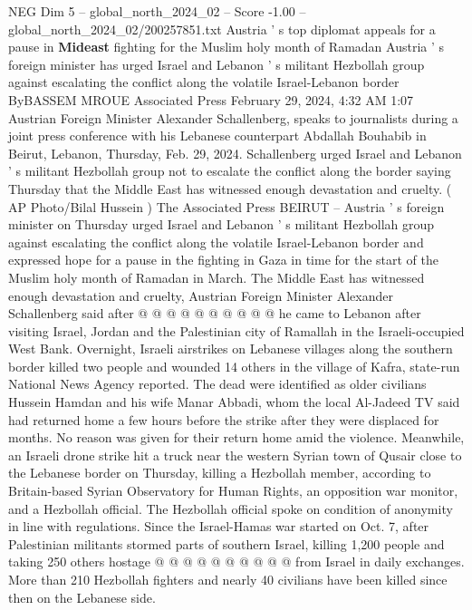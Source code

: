 \begin{textsample}{NEG Dim 5 – global\_north\_2024\_02 – Score -1.00 – global\_north\_2024\_02/200257851.txt}  \label{ex:f5_neg_211}
Austria ' s top diplomat appeals for a pause in \textbf{Mideast} fighting for the Muslim holy month of Ramadan Austria ' s foreign minister has urged Israel and Lebanon ' s militant Hezbollah group against escalating the conflict along the volatile Israel-Lebanon border ByBASSEM MROUE Associated Press February 29, 2024, 4:32 AM 1:07 Austrian Foreign Minister Alexander Schallenberg, speaks to journalists during a joint press conference with his Lebanese counterpart Abdallah Bouhabib in Beirut, Lebanon, Thursday, Feb. 29, 2024.
Schallenberg urged Israel and Lebanon ' s militant Hezbollah group not to escalate the conflict along the border saying Thursday that the Middle East has witnessed enough devastation and cruelty. ( AP Photo/Bilal Hussein ) The Associated Press BEIRUT -- Austria ' s foreign minister on Thursday urged Israel and Lebanon ' s militant Hezbollah group against escalating the conflict along the volatile Israel-Lebanon border and expressed hope for a pause in the fighting in Gaza in time for the start of the Muslim holy month of Ramadan in March.
The Middle East has witnessed enough devastation and cruelty, Austrian Foreign Minister Alexander Schallenberg said after @ @ @ @ @ @ @ @ @ @ he came to Lebanon after visiting Israel, Jordan and the Palestinian city of Ramallah in the Israeli-occupied West Bank.
Overnight, Israeli airstrikes on Lebanese villages along the southern border killed two people and wounded 14 others in the village of Kafra, state-run National News Agency reported.
The dead were identified as older civilians Hussein Hamdan and his wife Manar Abbadi, whom the local Al-Jadeed TV said had returned home a few hours before the strike after they were displaced for months.
No reason was given for their return home amid the violence.
Meanwhile, an Israeli drone strike hit a truck near the western Syrian town of Qusair close to the Lebanese border on Thursday, killing a Hezbollah member, according to Britain-based Syrian Observatory for Human Rights, an opposition war monitor, and a Hezbollah official.
The Hezbollah official spoke on condition of anonymity in line with regulations.
Since the Israel-Hamas war started on Oct. 7, after Palestinian militants stormed parts of southern Israel, killing 1,200 people and taking 250 others hostage @ @ @ @ @ @ @ @ @ @ from Israel in daily exchanges.
More than 210 Hezbollah fighters and nearly 40 civilians have been killed since then on the Lebanese side.

\end{textsample}
